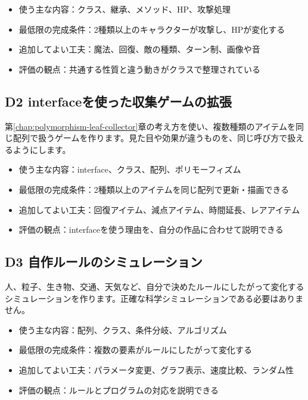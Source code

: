 \begin{itemize}
    \item 使う主な内容：クラス、継承、メソッド、HP、攻撃処理
    \item 最低限の完成条件：2種類以上のキャラクターが攻撃し、HPが変化する
    \item 追加してよい工夫：魔法、回復、敵の種類、ターン制、画像や音
    \item 評価の観点：共通する性質と違う動きがクラスで整理されている
\end{itemize}

\subsection{D2 interfaceを使った収集ゲームの拡張}

第\ref{chap:polymorphism-leaf-collector}章の考え方を使い、複数種類のアイテムを同じ配列で扱うゲームを作ります。見た目や効果が違うものを、同じ呼び方で扱えるようにします。

\begin{itemize}
    \item 使う主な内容：interface、クラス、配列、ポリモーフィズム
    \item 最低限の完成条件：2種類以上のアイテムを同じ配列で更新・描画できる
    \item 追加してよい工夫：回復アイテム、減点アイテム、時間延長、レアアイテム
    \item 評価の観点：interfaceを使う理由を、自分の作品に合わせて説明できる
\end{itemize}

\subsection{D3 自作ルールのシミュレーション}

人、粒子、生き物、交通、天気など、自分で決めたルールにしたがって変化するシミュレーションを作ります。正確な科学シミュレーションである必要はありません。

\begin{itemize}
    \item 使う主な内容：配列、クラス、条件分岐、アルゴリズム
    \item 最低限の完成条件：複数の要素がルールにしたがって変化する
    \item 追加してよい工夫：パラメータ変更、グラフ表示、速度比較、ランダム性
    \item 評価の観点：ルールとプログラムの対応を説明できる
\end{itemize}

